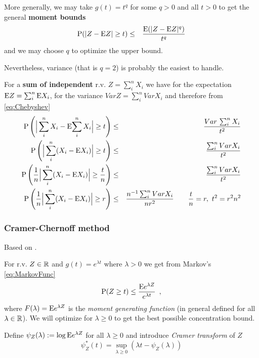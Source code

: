 More generally, we may take $g(t) = t^q$ for some $q>0$ and all $t>0$ to get the general \textbf{moment bounds}
\begin{eqnarray}\label{eq:momentBound}
\mathrm{P}(|Z - \mathrm{E}{Z}| \geq t) & \leq & \frac{\mathrm{E} (|Z - \mathrm{E}{Z}|^q)}{t^q}
\end{eqnarray}
and we may choose $q$ to optimize the upper bound. 

Nevertheless, variance (that is $q = 2$) is probably the easiest to handle.

For a \textbf{sum of independent} r.v. $Z = \sum_i^n X_i$ we have for the expectation $\mathrm{E}{Z} = \sum_i^n \mathrm{E}{X_i}$, for the variance $Var Z = \sum_i^n Var X_i$ and therefore from \eqref{eq:Chebyshev}
\begin{eqnarray}\label{eq:ChebyshevSum}
\mathrm{P}\left(\Big| \sum_i^n X_i - \mathrm{E}{\sum_i^n X_i} \Big| \geq t\right) & \leq & \frac{Var \, \sum_i^n X_i}{t^2} \nonumber \\
\mathrm{P}\left(\Big| \sum_i^n (X_i - \mathrm{E}{X_i}) \Big| \geq t\right) & \leq & \frac{\sum_i^n Var X_i}{t^2} \nonumber \\
\mathrm{P}\left(\frac{1}{n} \Big| \sum_i^n (X_i - \mathrm{E}{X_i}) \Big| \geq \frac{t}{n}\right) & \leq & \frac{\sum_i^n Var X_i}{t^2} \nonumber \\
\mathrm{P}\left(\frac{1}{n} \Big| \sum_i^n (X_i - \mathrm{E}{X_i}) \Big| \geq r \right) & \leq & \frac{n^{-1} \sum_i^n Var X_i}{n r^2} \qquad \frac{t}{n} = r, \ t^2 = r^2n^2
\end{eqnarray}

\subsubsection{Cramer-Chernoff method}

Based on \cite{Boucheron2013}.

For r.v. $Z \in \mathbb{R}$ and $g(t) = e^{\lambda t}$ where $\lambda > 0$ we get from Markov's \eqref{eq:MarkovFunc}
\begin{equation}\label{eq:MarkovExp}
\mathrm{P}(Z \geq t) \leq \frac{\mathrm{E} e^{\lambda Z}}{e^{\lambda t}} \enspace ,
\end{equation}
where $F(\lambda) = \mathrm{E} e^{\lambda Z}$ is the \emph{moment generating function} (in general defined for all $\lambda \in \mathbb{R}{}$).
We will optimize for $\lambda \geq 0$ to get the best possible concentration bound.

Define $\psi_Z(\lambda) := \log \mathrm{E} e^{\lambda Z}$ for all $\lambda \geq 0$ and introduce \emph{Cramer transform} of $Z$
\begin{equation}\label{eq:CramerTransform}
\psi_Z^*(t) = \sup_{\lambda \geq 0}(\lambda t - \psi_Z(\lambda))
\end{equation}

